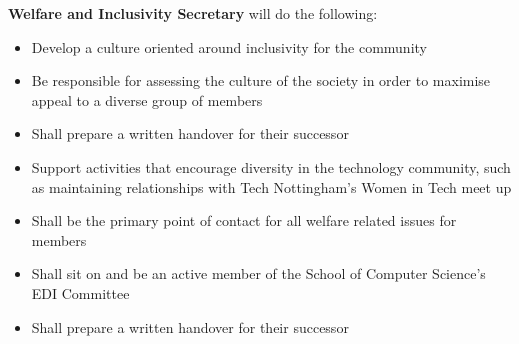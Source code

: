 \begin{subclause}
  \textbf{Welfare and Inclusivity Secretary} will do the following:
  \begin{itemize}[label=--,topsep=0em,itemsep=0em]
    \item Develop a culture oriented around inclusivity for the community
    \item Be responsible for assessing the culture of the society in order to maximise appeal to a diverse group of members
    \item Shall prepare a written handover for their successor
    \item Support activities that encourage diversity in the technology community, such as maintaining relationships with Tech Nottingham’s Women in Tech meet up
    \item Shall be the primary point of contact for all welfare related issues for members
    \item Shall sit on and be an active member of the School of Computer Science's EDI Committee
    \item Shall prepare a written handover for their successor
  \end{itemize}
\end{subclause}

